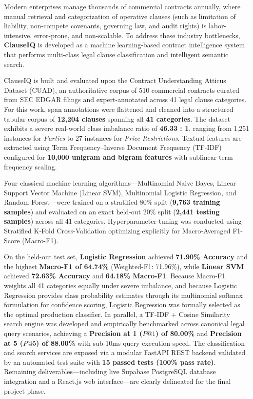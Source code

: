\documentclass[12pt, a4paper]{report}
\begin{document}
\vspace{0.2in}

{\justifying\fontsize{12}{17}\selectfont
Modern enterprises manage thousands of commercial contracts annually, where manual retrieval and categorization of operative clauses (such as limitation of liability, non-compete covenants, governing law, and audit rights) is labor-intensive, error-prone, and non-scalable. To address these industry bottlenecks, \textbf{ClauseIQ} is developed as a machine learning-based contract intelligence system that performs multi-class legal clause classification and intelligent semantic search.

ClauseIQ is built and evaluated upon the Contract Understanding Atticus Dataset (CUAD), an authoritative corpus of 510 commercial contracts curated from SEC EDGAR filings and expert-annotated across 41 legal clause categories. For this work, span annotations were flattened and cleaned into a structured tabular corpus of \textbf{12,204 clauses} spanning all \textbf{41 categories}. The dataset exhibits a severe real-world class imbalance ratio of \textbf{46.33 : 1}, ranging from 1,251 instances for \textit{Parties} to 27 instances for \textit{Price Restrictions}. Textual features are extracted using Term Frequency--Inverse Document Frequency (TF-IDF) configured for \textbf{10,000 unigram and bigram features} with sublinear term frequency scaling.

Four classical machine learning algorithms—Multinomial Naive Bayes, Linear Support Vector Machine (Linear SVM), Multinomial Logistic Regression, and Random Forest—were trained on a stratified 80\% split (\textbf{9,763 training samples}) and evaluated on an exact held-out 20\% split (\textbf{2,441 testing samples}) across all 41 categories. Hyperparameter tuning was conducted using Stratified K-Fold Cross-Validation optimizing explicitly for Macro-Averaged F1-Score (Macro-F1). 

On the held-out test set, \textbf{Logistic Regression} achieved \textbf{71.90\% Accuracy} and the highest \textbf{Macro-F1 of 64.74\%} (Weighted-F1: 71.96\%), while \textbf{Linear SVM} achieved \textbf{72.63\% Accuracy} and \textbf{64.18\% Macro-F1}. Because Macro-F1 weights all 41 categories equally under severe imbalance, and because Logistic Regression provides class probability estimates through its multinomial softmax formulation for confidence scoring, Logistic Regression was formally selected as the optimal production classifier. In parallel, a TF-IDF + Cosine Similarity search engine was developed and empirically benchmarked across canonical legal query scenarios, achieving a \textbf{Precision at 1 ($P@1$) of 80.00\%} and \textbf{Precision at 5 ($P@5$) of 88.00\%} with sub-10ms query execution speed. The classification and search services are exposed via a modular FastAPI REST backend validated by an automated test suite with \textbf{15 passed tests (100\% pass rate)}. Remaining deliverables—including live Supabase PostgreSQL database integration and a React.js web interface—are clearly delineated for the final project phase.\par}
\end{document}
